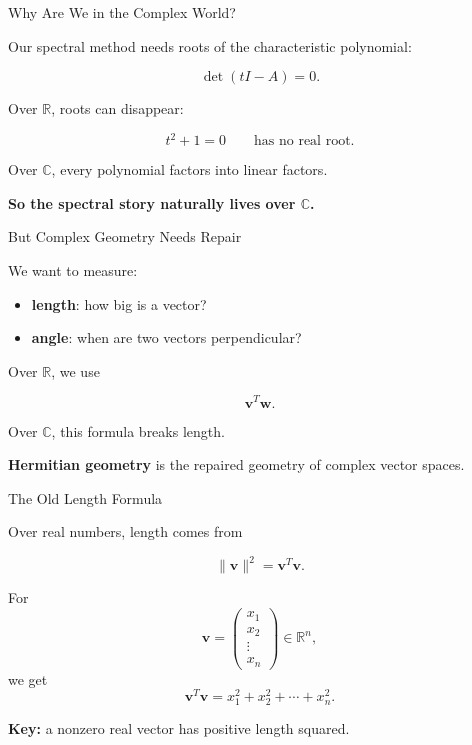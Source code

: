 \documentclass[10pt]{beamer}
\theoremstyle{definition}
\newcommand{\x}[1]{\alert{\textbf{#1}}}
\begin{document}
\begin{frame}{Why Are We in the Complex World?}

Our spectral method needs roots of the characteristic polynomial:

$$
\det(tI-A)=0.
$$

\vfill\pause

Over $\mathbb{R}$, roots can disappear:

$$
t^2+1=0
\qquad\text{has no real root.}
$$

\vfill

Over $\mathbb{C}$, every polynomial factors into linear factors.

\vfill\pause

\x{So the spectral story naturally lives over $\mathbb{C}$.}

\end{frame}


\begin{frame}{But Complex Geometry Needs Repair}

We want to measure:

\vfill

\begin{itemize}
\item \x{length}: how big is a vector?
\item \x{angle}: when are two vectors perpendicular?
\end{itemize}

\vfill\pause

Over $\mathbb{R}$, we use

$$
\mathbf v^T\mathbf w.
$$

\vfill

Over $\mathbb{C}$, this formula breaks length.

\vfill\pause

\x{Hermitian geometry} is the repaired geometry of complex vector spaces.

\end{frame}


\begin{frame}{The Old Length Formula}

Over real numbers, length comes from

$$
\|\mathbf{v}\|^2=\mathbf{v}^T\mathbf{v}.
$$

\vfill

For
$$
\mathbf{v}=\begin{pmatrix}x_1\\x_2\\ \vdots \\x_n\end{pmatrix}\in\mathbb{R}^n,
$$
we get
$$
\mathbf{v}^T\mathbf{v}
=x_1^2+x_2^2+\cdots+x_n^2.
$$

\vfill

\x{Key:} a nonzero real vector has positive length squared.

\end{frame}
\end{document}
